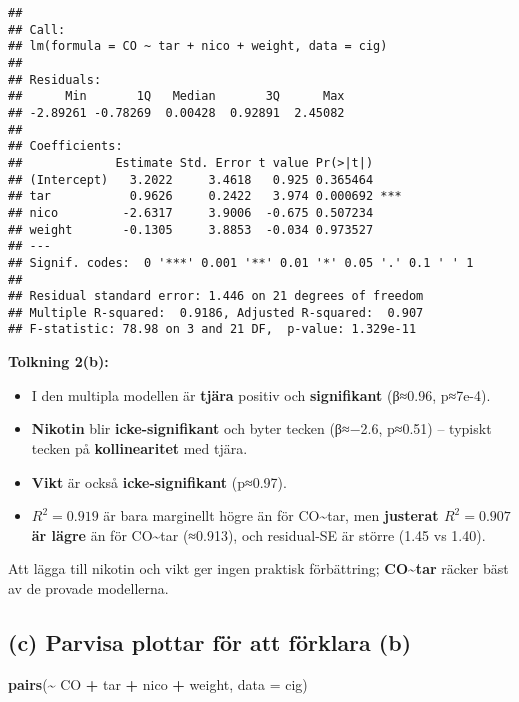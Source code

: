\documentclass[
  11pt,
]{article}
\newenvironment{Shaded}{\begin{snugshade}}{\end{snugshade}}
\newcommand{\AttributeTok}[1]{\textcolor[rgb]{0.13,0.29,0.53}{#1}}
\newcommand{\FunctionTok}[1]{\textcolor[rgb]{0.13,0.29,0.53}{\textbf{#1}}}
\newcommand{\NormalTok}[1]{#1}
\newcommand{\SpecialCharTok}[1]{\textcolor[rgb]{0.81,0.36,0.00}{\textbf{#1}}}
\providecommand{\tightlist}{%
  \setlength{\itemsep}{0pt}\setlength{\parskip}{0pt}}
\begin{document}
\begin{verbatim}
## 
## Call:
## lm(formula = CO ~ tar + nico + weight, data = cig)
## 
## Residuals:
##      Min       1Q   Median       3Q      Max 
## -2.89261 -0.78269  0.00428  0.92891  2.45082 
## 
## Coefficients:
##             Estimate Std. Error t value Pr(>|t|)    
## (Intercept)   3.2022     3.4618   0.925 0.365464    
## tar           0.9626     0.2422   3.974 0.000692 ***
## nico         -2.6317     3.9006  -0.675 0.507234    
## weight       -0.1305     3.8853  -0.034 0.973527    
## ---
## Signif. codes:  0 '***' 0.001 '**' 0.01 '*' 0.05 '.' 0.1 ' ' 1
## 
## Residual standard error: 1.446 on 21 degrees of freedom
## Multiple R-squared:  0.9186, Adjusted R-squared:  0.907 
## F-statistic: 78.98 on 3 and 21 DF,  p-value: 1.329e-11
\end{verbatim}

\textbf{Tolkning 2(b):}

\begin{itemize}
\tightlist
\item
  I den multipla modellen är \textbf{tjära} positiv och
  \textbf{signifikant} (β≈0.96, p≈7e-4).
\item
  \textbf{Nikotin} blir \textbf{icke-signifikant} och byter tecken
  (β≈−2.6, p≈0.51) -- typiskt tecken på \textbf{kollinearitet} med
  tjära.
\item
  \textbf{Vikt} är också \textbf{icke-signifikant} (p≈0.97).
\item
  \(R^2=0.919\) är bara marginellt högre än för CO\textasciitilde tar,
  men \textbf{justerat \(R^2=0.907\) är lägre} än för
  CO\textasciitilde tar (≈0.913), och residual-SE är större (1.45 vs
  1.40).
\end{itemize}

Att lägga till nikotin och vikt ger ingen praktisk förbättring;
\textbf{CO\textasciitilde tar} räcker bäst av de provade modellerna.

\subsection{(c) Parvisa plottar för att förklara
(b)}\label{c-parvisa-plottar-fuxf6r-att-fuxf6rklara-b}

\begin{Shaded}
\begin{Highlighting}[]
\FunctionTok{pairs}\NormalTok{(}\SpecialCharTok{\textasciitilde{}}\NormalTok{ CO }\SpecialCharTok{+}\NormalTok{ tar }\SpecialCharTok{+}\NormalTok{ nico }\SpecialCharTok{+}\NormalTok{ weight, }\AttributeTok{data =}\NormalTok{ cig)}
\end{Highlighting}
\end{Shaded}
\end{document}
